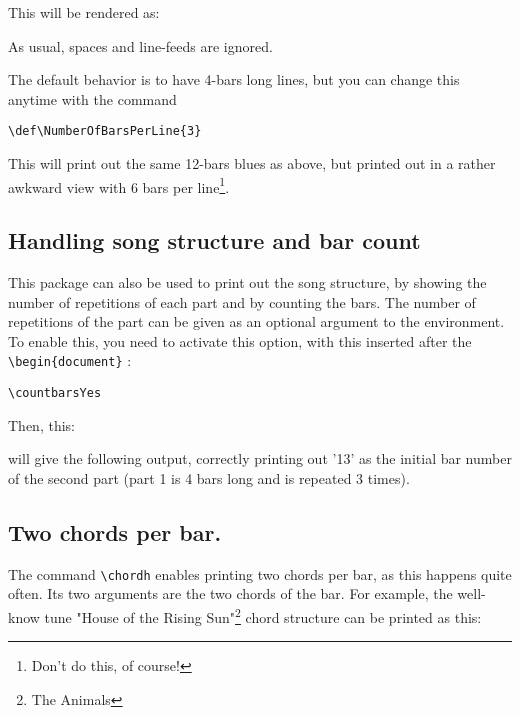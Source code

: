 \documentclass[11pt]{article}
\begin{document}



This will be rendered as:



As usual, spaces and line-feeds are ignored.

The default behavior is to have 4-bars long lines, but you can change this anytime with the command 

\begin{lstlisting}
\def\NumberOfBarsPerLine{3}
\end{lstlisting}

This will print out the same 12-bars blues as above, but printed out in a rather awkward view with 6 bars per line\footnote{Don't do this, of course!}.

\def\NumberOfBarsPerLine{6}


\subsection{Handling song structure and bar count}

This package can also be used to print out the song structure, by showing the number of repetitions of each part and by counting the bars.
The number of repetitions of the part can be given as an optional argument to the environment.
To enable this, you need to activate this option, with this inserted after the \verb!\begin{document}! :

\begin{lstlisting}
\countbarsYes
\end{lstlisting}

Then, this:


will give the following output, correctly printing out '13' as the initial bar number of the second part (part 1 is 4 bars long and is repeated 3 times).

\def\NumberOfBarsPerLine{4}
\resetchordbars
\countbarsYes


\subsection{Two chords per bar.} 
The command \verb|\chordh| enables printing two chords per bar, as this happens quite often.
Its two arguments are the two chords of the bar.
For example, the well-know tune "House of the Rising Sun"\footnote{The Animals} chord structure can be printed as this:
\end{document}
